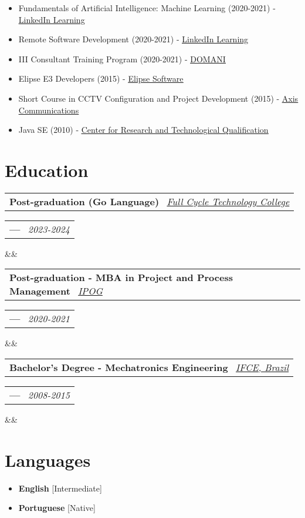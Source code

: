 \documentclass[11pt,a4paper,sans]{moderncv}
\makeatletter
\newcommand*{\customcventry}[7][.13em]{
\begin{tabular}{@{}l}
{\bfseries #4} \
{\itshape #3}
\end{tabular}
\hfill
\begin{tabular}{l@{}}
{\bfseries #5} \
{\itshape #2}
\end{tabular}
\ifx&#7&%
\else{\
\begin{minipage}{\maincolumnwidth}%
\small#7%
\end{minipage}}\fi%
\par\addvspace{#1}}
\makeatother
\begin{document}
{\begin{itemize}[label=\textbullet]
	  \item Fundamentals of Artificial Intelligence: Machine Learning (2020-2021) - \underline{\color{blue}\href{https://linkedin.com/learning}{LinkedIn Learning}}
	  \item Remote Software Development (2020-2021) - \underline{\color{blue}\href{https://linkedin.com/learning}{LinkedIn Learning}}
	  \item III Consultant Training Program (2020-2021) - \underline{\color{blue}\href{https://domani.com.br}{DOMANI}}
	  \item Elipse E3 Developers (2015) - \underline{\color{blue}\href{https://elipse.com}{Elipse Software}}
	  \item Short Course in CCTV Configuration and Project Development (2015) - \underline{\color{blue}\href{https://axis.com}{Axis Communications}}
	  \item Java SE (2010) - \underline{\color{blue}\href{https://cpqt.com.br}{Center for Research and Technological Qualification}}
  \end{itemize}}

\section{Education}
\customcventry{2023-2024}{{\color{blue}\href{https://fctech.edu.br}{Full Cycle Technology College}}}{Post-graduation (Go Language)}{---}{}{}
\customcventry{2020-2021}{{\color{blue}\href{https://www.ipog.edu.br}{IPOG}}}{Post-graduation - MBA in Project and Process Management}{---}{}{}
\customcventry{2008-2015}{{\color{blue}\href{https://ifce.edu.br}{IFCE, Brazil}}}{Bachelor's Degree - Mechatronics Engineering}{---}{}{}

\section{Languages}
\begin{multicols}{2}
	\begin{itemize}[label=\textbullet]
		\item \textbf{English} [Intermediate]
		\item \textbf{Portuguese} [Native]
	\end{itemize}
\end{multicols}
\end{document}

